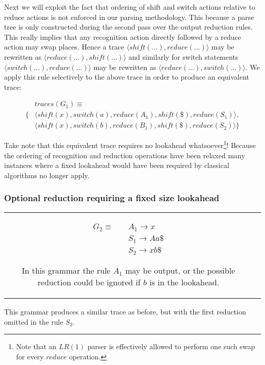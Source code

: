 \documentclass[a4paper,11pt]{article}
\begin{document}
Next we will exploit the fact that ordering of shift and switch actions relative to reduce actions is not enforced in our parsing methodology. This because a parse tree is only constructed during the second pass over the output reduction rules.
This really implies that any recognition action directly followed by a reduce action may swap places. 
Hence a trace $\langle shift(...), reduce(...) \rangle$ may be rewritten as $\langle reduce(...), shift(...) \rangle$ and similarly for switch statements $\langle switch(...), reduce(...) \rangle$ may be rewritten as $\langle reduce(...), switch(...) \rangle$.
We apply this rule selectively to the above trace in order to produce an equivalent trace:

{\small\parbox{.3\textwidth}{\begin{align*}
&traces(G_1) \equiv \\
\{ & \langle shift(x), switch(a), reduce(A_1), shift(\$), reduce(S_1) \rangle, \\
   & \langle shift(x), switch(b), reduce(B_1), shift(\$), reduce(S_2) \rangle \}
\end{align*}}}

Take note that this equivalent trace requires no lookahead whatsoever\footnote{Note that an $LR(1)$ parser is effectively allowed to perform one such swap for every $reduce$ operation.}!
Because the ordering of recognition and reduction operations have been relaxed many instances where a fixed lookahead would have been required by classical algorithms no longer apply.

\subsubsection{Optional reduction requiring a fixed size lookahead}
\begin{tabular}[t]{cl}
\parbox{.3\textwidth}{
\begin{align*}
G_2 \equiv \quad & A_1 \rightarrow x\\
                 & S_1 \rightarrow A a \$\\
                 & S_2 \rightarrow x b \$
\end{align*}}
\parbox{.6\textwidth}{In this grammar the rule $A_1$ may be output, or the possible reduction could be ignored if $b$ is in the lookahead.}
\end{tabular}

This grammar produces a similar trace as before, but with the first reduction omitted in the rule $S_2$.
\end{document}
